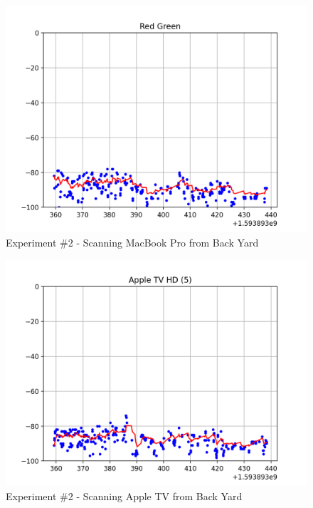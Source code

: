 \documentclass[12pt]{article}
\begin{document}
\begin{figure}[ht]
    \centering
    \includegraphics[width=1.0\textwidth]{Experiment-2-MBP-GM.png}
    \caption{Experiment \#2 - Scanning MacBook Pro from Back Yard}
    \label{fig:experiment-2-mbp}
\end{figure}

\begin{figure}[ht]
    \centering
    \includegraphics[width=1.0\textwidth]{Experiment-2-ATV-GM.png}
    \caption{Experiment \#2 - Scanning Apple TV from Back Yard}
    \label{fig:experiment-2-atv}
\end{figure}



%
%
\end{document}
